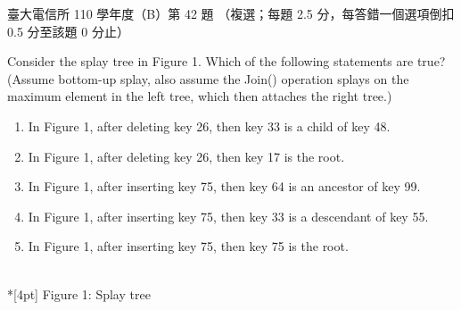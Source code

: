 \begin{pastexam}[label={px:ntu-110-comm-dsa-42}]{臺大電信所 110 學年度（B）第 42 題}
（複選；每題 2.5 分，每答錯一個選項倒扣 0.5 分至該題 0 分止）

Consider the splay tree in Figure 1. Which of the following statements are true?\\
(Assume bottom-up splay, also assume the Join() operation splays on the maximum element in the left tree, which then attaches the right tree.)
\begin{enumerate}[label=\Alph*.]
\item In Figure 1, after deleting key 26, then key 33 is a child of key 48.
\item In Figure 1, after deleting key 26, then key 17 is the root.
\item In Figure 1, after inserting key 75, then key 64 is an ancestor of key 99.
\item In Figure 1, after inserting key 75, then key 33 is a descendant of key 55.
\item In Figure 1, after inserting key 75, then key 75 is the root.
\end{enumerate}
\begin{center}
\\*[4pt] Figure 1: Splay tree
\end{center}
\end{pastexam}

